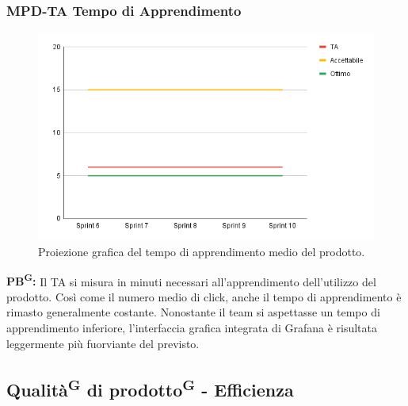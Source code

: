 \documentclass[8pt]{article}
\newcommand{\glossterm}[1]{#1\textsuperscript{G}} %
\begin{document}
\subsubsection{MPD-TA Tempo di Apprendimento}
\begin{figure}[h!]
    \centering
    \includegraphics[width=1\textwidth]{images_pdq/TA.png}
    \caption{Proiezione grafica del tempo di apprendimento medio del prodotto.}
    \label{fig:Proiezione grafica del tempo di apprendimento medio del prodotto}
\end{figure}
\textbf{\glossterm{PB}:} Il TA si misura in minuti necessari all'apprendimento dell'utilizzo del prodotto. Così come il numero medio di click, anche il tempo di apprendimento è rimasto generalmente costante. Nonostante il team si aspettasse un tempo di apprendimento inferiore, l'interfaccia grafica integrata di Grafana è risultata leggermente più fuorviante del previsto.
\clearpage
\subsection{\glossterm{Qualità} di \glossterm{prodotto} - Efficienza}
\end{document}

